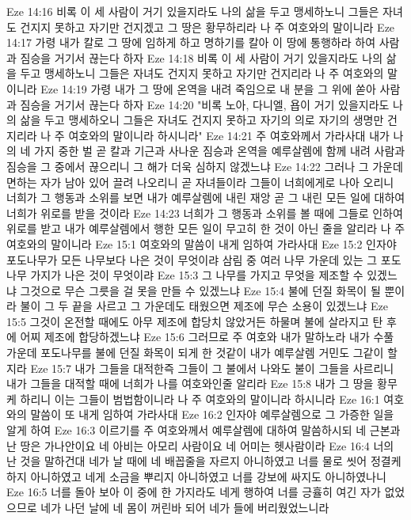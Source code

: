 Eze 14:16  비록 이 세 사람이 거기 있을지라도 나의 삶을 두고 맹세하노니 그들은 자녀도 건지지 못하고 자기만 건지겠고 그 땅은 황무하리라 나 주 여호와의 말이니라
Eze 14:17  가령 내가 칼로 그 땅에 임하게 하고 명하기를 칼아 이 땅에 통행하라 하여 사람과 짐승을 거기서 끊는다 하자
Eze 14:18  비록 이 세 사람이 거기 있을지라도 나의 삶을 두고 맹세하노니 그들은 자녀도 건지지 못하고 자기만 건지리라 나 주 여호와의 말이니라
Eze 14:19  가령 내가 그 땅에 온역을 내려 죽임으로 내 분을 그 위에 쏟아 사람과 짐승을 거기서 끊는다 하자
Eze 14:20  "비록 노아, 다니엘, 욥이 거기 있을지라도 나의 삶을 두고 맹세하오니 그들은 자녀도 건지지 못하고 자기의 의로 자기의 생명만 건지리라 나 주 여호와의 말이니라 하시니라"
Eze 14:21  주 여호와께서 가라사대 내가 나의 네 가지 중한 벌 곧 칼과 기근과 사나운 짐승과 온역을 예루살렘에 함께 내려 사람과 짐승을 그 중에서 끊으리니 그 해가 더욱 심하지 않겠느냐
Eze 14:22  그러나 그 가운데 면하는 자가 남아 있어 끌려 나오리니 곧 자녀들이라 그들이 너희에게로 나아 오리니 너희가 그 행동과 소위를 보면 내가 예루살렘에 내린 재앙 곧 그 내린 모든 일에 대하여 너희가 위로를 받을 것이라
Eze 14:23  너희가 그 행동과 소위를 볼 때에 그들로 인하여 위로를 받고 내가 예루살렘에서 행한 모든 일이 무고히 한 것이 아닌 줄을 알리라 나 주 여호와의 말이니라
Eze 15:1  여호와의 말씀이 내게 임하여 가라사대
Eze 15:2  인자야 포도나무가 모든 나무보다 나은 것이 무엇이랴 삼림 중 여러 나무 가운데 있는 그 포도나무 가지가 나은 것이 무엇이랴
Eze 15:3  그 나무를 가지고 무엇을 제조할 수 있겠느냐 그것으로 무슨 그릇을 걸 못을 만들 수 있겠느냐
Eze 15:4  불에 던질 화목이 될 뿐이라 불이 그 두 끝을 사르고 그 가운데도 태웠으면 제조에 무슨 소용이 있겠느냐
Eze 15:5  그것이 온전할 때에도 아무 제조에 합당치 않았거든 하물며 불에 살라지고 탄 후에 어찌 제조에 합당하겠느냐
Eze 15:6  그러므로 주 여호와 내가 말하노라 내가 수풀 가운데 포도나무를 불에 던질 화목이 되게 한 것같이 내가 예루살렘 거민도 그같이 할지라
Eze 15:7  내가 그들을 대적한즉 그들이 그 불에서 나와도 불이 그들을 사르리니 내가 그들을 대적할 때에 너희가 나를 여호와인줄 알리라
Eze 15:8  내가 그 땅을 황무케 하리니 이는 그들이 범법함이니라 나 주 여호와의 말이니라 하시니라
Eze 16:1  여호와의 말씀이 또 내게 임하여 가라사대
Eze 16:2  인자야 예루살렘으로 그 가증한 일을 알게 하여
Eze 16:3  이르기를 주 여호와께서 예루살렘에 대하여 말씀하시되 네 근본과 난 땅은 가나안이요 네 아비는 아모리 사람이요 네 어미는 헷사람이라
Eze 16:4  너의 난 것을 말하건대 네가 날 때에 네 배꼽줄을 자르지 아니하였고 너를 물로 씻어 정결케 하지 아니하였고 네게 소금을 뿌리지 아니하였고 너를 강보에 싸지도 아니하였나니
Eze 16:5  너를 돌아 보아 이 중에 한 가지라도 네게 행하여 너를 긍휼히 여긴 자가 없었으므로 네가 나던 날에 네 몸이 꺼린바 되어 네가 들에 버리웠었느니라
